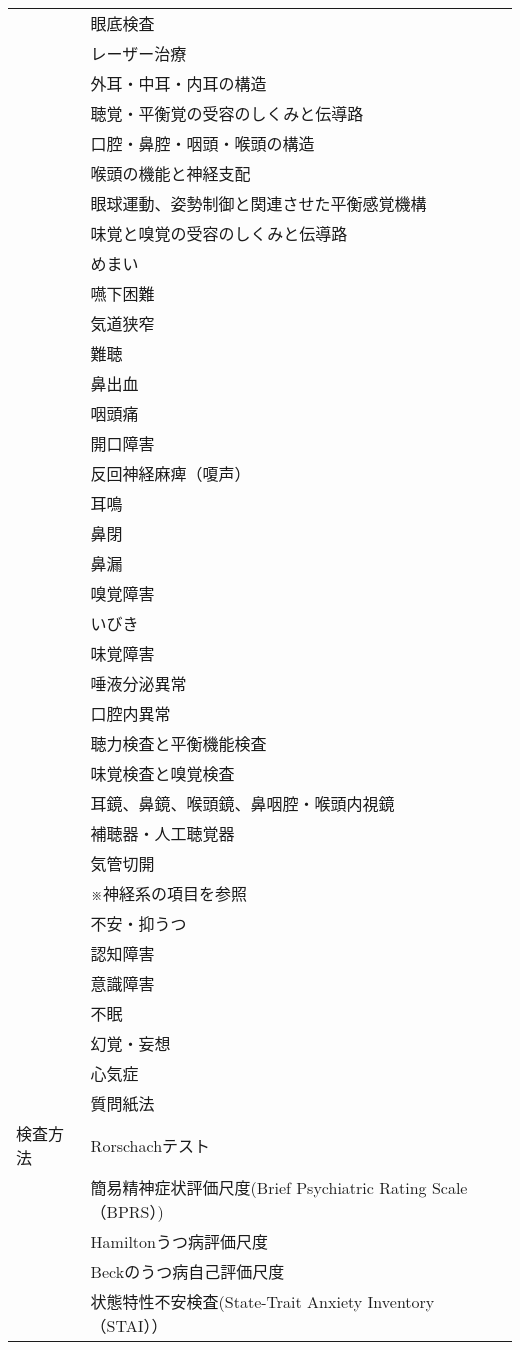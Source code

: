 \begin{xltabular}{\linewidth}{XX}
 & 眼底検査 \\
 & レーザー治療 \\
 & 外耳・中耳・内耳の構造 \\
 & 聴覚・平衡覚の受容のしくみと伝導路 \\
 & 口腔・鼻腔・咽頭・喉頭の構造 \\
 & 喉頭の機能と神経支配 \\
 & 眼球運動、姿勢制御と関連させた平衡感覚機構 \\
 & 味覚と嗅覚の受容のしくみと伝導路 \\
 & めまい \\
 & 嚥下困難 \\
 & 気道狭窄 \\
 & 難聴 \\
 & 鼻出血 \\
 & 咽頭痛 \\
 & 開口障害 \\
 & 反回神経麻痺（嗄声） \\
 & 耳鳴 \\
 & 鼻閉 \\
 & 鼻漏 \\
 & 嗅覚障害 \\
 & いびき \\
 & 味覚障害 \\
 & 唾液分泌異常 \\
 & 口腔内異常 \\
 & 聴力検査と平衡機能検査 \\
 & 味覚検査と嗅覚検査 \\
 & 耳鏡、鼻鏡、喉頭鏡、鼻咽腔・喉頭内視鏡 \\
 & 補聴器・人工聴覚器 \\
 & 気管切開 \\
 & ※神経系の項目を参照 \\
 & 不安・抑うつ \\
 & 認知障害 \\
 & 意識障害 \\
 & 不眠 \\
 & 幻覚・妄想 \\
 & 心気症 \\
 & 質問紙法 \\
検査方法 & Rorschachテスト \\
 & 簡易精神症状評価尺度(Brief Psychiatric Rating Scale （BPRS）) \\
 & Hamiltonうつ病評価尺度 \\
 & Beckのうつ病自己評価尺度 \\
 & 状態特性不安検査(State-Trait Anxiety Inventory　 （STAI）） \\

\end{xltabular}
